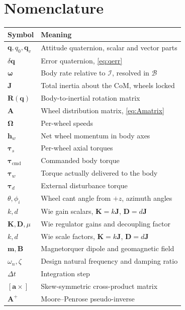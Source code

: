 \documentclass[conference,10pt,a4paper]{IEEEtran}
\newcommand{\vect}[1]{\bm{#1}}
\newcommand{\mat}[1]{\bm{#1}}
\newcommand{\pinv}{^{+}}
\newcommand{\FB}{\mathcal{B}}
\newcommand{\FI}{\mathcal{I}}
\newcommand{\skewm}[1]{\left[#1\times\right]}
\begin{document}
\appendices

\section{Nomenclature}
\label{app:nomenclature}

\begin{table}[!h]
\centering
\footnotesize
\begin{tabularx}{\columnwidth}{@{}lX@{}}
\toprule
\textbf{Symbol} & \textbf{Meaning} \\
\midrule
$\vect{q},q_0,\vect{q}_v$ & Attitude quaternion, scalar and vector parts \\
$\delta\vect{q}$        & Error quaternion, \cref{eq:qerr} \\
$\vect{\omega}$         & Body rate relative to $\FI$, resolved in $\FB$ \\
$\mat{J}$               & Total inertia about the CoM, wheels locked \\
$\mat{R}(\vect{q})$     & Body-to-inertial rotation matrix \\
$\mat{A}$               & Wheel distribution matrix, \cref{eq:Amatrix} \\
$\vect{\Omega}$         & Per-wheel speeds \\
$\vect{h}_w$            & Net wheel momentum in body axes \\
$\vect{\tau}_s$         & Per-wheel axial torques \\
$\vect{\tau}_\text{cmd}$& Commanded body torque \\
$\vect{\tau}_w$         & Torque actually delivered to the body \\
$\vect{\tau}_d$         & External disturbance torque \\
$\theta,\phi_i$         & Wheel cant angle from $+z$, azimuth angles \\
$k,d$                   & Wie gain scalars, $\mat{K}=k\mat{J}$, $\mat{D}=d\mat{J}$ \\
$\mat{K},\mat{D},\mu$   & Wie regulator gains and decoupling factor \\
$k,d$                   & Wie scale factors, $\mat{K}=k\mat{J}$, $\mat{D}=d\mat{J}$ \\
$\vect{m},\vect{B}$     & Magnetorquer dipole and geomagnetic field \\
$\omega_n,\zeta$        & Design natural frequency and damping ratio \\
$\Delta t$              & Integration step \\
$\skewm{\vect{a}}$      & Skew-symmetric cross-product matrix \\
$\mat{A}\pinv$          & Moore--Penrose pseudo-inverse \\
\bottomrule
\end{tabularx}
\end{table}
\end{document}
